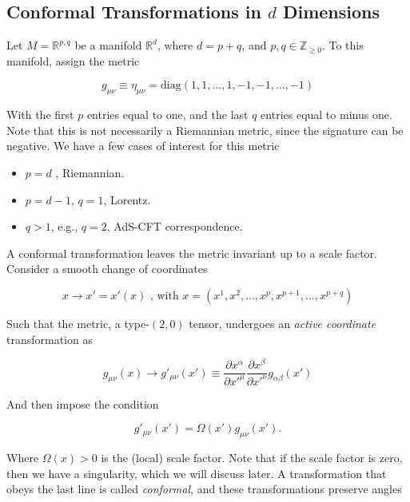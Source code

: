 \subsection*{Conformal Transformations in $d$ Dimensions}

\noindent Let $M = \mathbb{R}^{p,q}$ be a manifold $\mathbb{R}^d$, where $d = p+q$, and $p,q \in \mathbb{Z}_{\ge 0}$. To this manifold, assign the metric

\begin{equation}
g_{\mu\nu} \equiv \eta_{\mu\nu} = \text{diag} (1,1,\dots,1,-1,-1,\dots,-1)
\end{equation}

\noindent With the first $p$ entries equal to one, and the last $q$ entries equal to minus one. Note that this is not necessarily a Riemannian metric, since the signature can be negative. We have a few cases of interest for this metric

\begin{itemize}
\item $p=d$ , Riemannian.
\item $p = d-1$, $q=1$, Lorentz.
\item $q > 1$, e.g., $q=2$, AdS-CFT correspondence.
\end{itemize}

\noindent A conformal transformation leaves the metric invariant up to a scale factor. \\

\noindent Consider a smooth change of coordinates

\begin{equation}
x \rightarrow x' = x' (x) \text{ , with } x = (x^1, x^2, \dots, x^p, x^{p+1}, \dots, x^{p+q})
\end{equation}

\noindent Such that the metric, a type-$(2,0)$ tensor, undergoes an \textit{active coordinate} transformation as

\begin{equation}
g_{\mu\nu} (x) \rightarrow g'_{\mu\nu} (x') \equiv \frac{\partial x^\alpha}{\partial x'^\mu} \frac{\partial x^\beta}{\partial x'^\nu} g_{\alpha \beta} (x') 
\end{equation}

\noindent And then impose the condition

\begin{equation}
g'_{\mu\nu} (x') = \Omega (x') g_{\mu\nu} (x').
\end{equation}

\noindent Where $\Omega(x) > 0$ is the (local) scale factor. Note that if the scale factor is zero, then we have a singularity, which we will discuss later. A transformation that obeys the last line is called \textit{conformal}, and these transformations preserve angles

